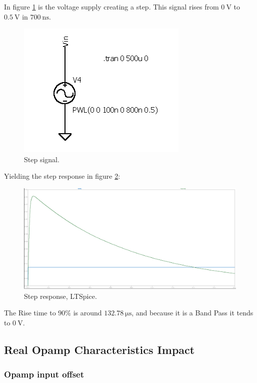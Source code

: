 In figure \ref{fig:StepSig} is the voltage supply creating a step. This signal rises from $\SI{0}{\volt}$ to $\SI{0.5}{\volt}$ in $\SI{700}{\nano\second}$.

\begin{figure}[H]
    \centering
    \includegraphics*[scale = 0.5]{Images/StepSig.png}
    \caption{Step signal.}
    \label{fig:StepSig}
\end{figure}


Yielding the step response in figure \ref{fig:StepLT}:

\begin{figure}[H]
    \centering
    \includegraphics*[scale = 0.25]{Images/StepResLT.png}
    \caption{Step response, LTSpice.}
    \label{fig:StepLT}
\end{figure}

The Rise time to $90\%$ is around $\SI{132.78}{\micro\second}$, and because it is a Band Pass it tends to $\SI{0}{\volt}$.

\subsection{Real Opamp Characteristics Impact}

\subsubsection{Opamp input offset}

